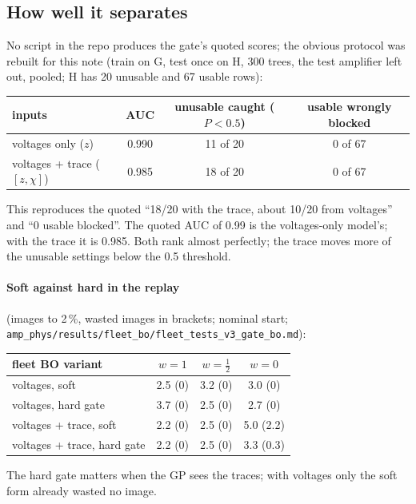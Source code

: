 \documentclass[10pt,a4paper]{article}
\newcommand{\code}[1]{\texttt{\small #1}}
\begin{document}
\subsection{How well it separates}
No script in the repo produces the gate's quoted scores; the obvious protocol was rebuilt for this note (train on G, test once
on H, 300 trees, the test amplifier left out, pooled; H has 20 unusable and 67 usable rows):
\begin{center}\small
\begin{tabular}{lccc}\toprule
inputs & AUC \cite{hanley1982} & unusable caught ($P<0.5$) & usable wrongly blocked\\\midrule
voltages only ($z$) & 0.990 & 11 of 20 & 0 of 67\\
voltages + trace ($[z,\chi]$) & 0.985 & 18 of 20 & 0 of 67\\\bottomrule
\end{tabular}
\end{center}
This reproduces the quoted ``18/20 with the trace, about 10/20 from voltages'' and ``0 usable blocked''. The quoted AUC of
0.99 is the voltages-only model's; with the trace it is 0.985. Both rank almost perfectly; the trace moves more of the unusable
settings below the 0.5 threshold.

\paragraph{Soft against hard in the replay} (images to 2\,\%, wasted images in brackets; nominal start;
\code{amp\_phys/results/fleet\_bo/fleet\_tests\_v3\_gate\_bo.md}):
\begin{center}\small
\begin{tabular}{lccc}\toprule
fleet BO variant & $w=1$ & $w=\frac12$ & $w=0$\\\midrule
voltages, soft & 2.5 (0) & 3.2 (0) & 3.0 (0)\\
voltages, hard gate & 3.7 (0) & 2.5 (0) & 2.7 (0)\\
voltages + trace, soft & 2.2 (0) & 2.5 (0) & 5.0 (2.2)\\
voltages + trace, hard gate & 2.2 (0) & 2.5 (0) & 3.3 (0.3)\\\bottomrule
\end{tabular}
\end{center}
The hard gate matters when the GP sees the traces; with voltages only the soft form already wasted no image.

\end{document}

